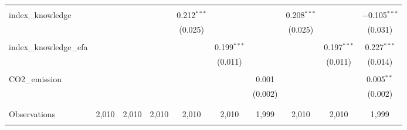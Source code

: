 \begin{tabular}{@{\extracolsep{5pt}}lccccccccc}
  & & & & & & & & & \\ 
 index\_knowledge &  &  &  & 0.212$^{***}$ &  &  & 0.208$^{***}$ &  & $-$0.105$^{***}$ \\ 
  &  &  &  & (0.025) &  &  & (0.025) &  & (0.031) \\ 
  & & & & & & & & & \\ 
 index\_knowledge\_efa &  &  &  &  & 0.199$^{***}$ &  &  & 0.197$^{***}$ & 0.227$^{***}$ \\ 
  &  &  &  &  & (0.011) &  &  & (0.011) & (0.014) \\ 
  & & & & & & & & & \\ 
 CO2\_emission &  &  &  &  &  & 0.001 &  &  & 0.005$^{**}$ \\ 
  &  &  &  &  &  & (0.002) &  &  & (0.002) \\ 
  & & & & & & & & & \\ 
\hline \\[-1.8ex] 

Observations & 2,010 & 2,010 & 2,010 & 2,010 & 2,010 & 1,999 & 2,010 & 2,010 & 1,999 \\ 
\hline 
\hline \\[-1.8ex] 
\end{tabular} 